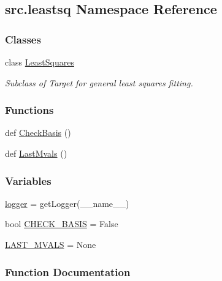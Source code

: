 \hypertarget{namespacesrc_1_1leastsq}{}\subsection{src.\+leastsq Namespace Reference}
\label{namespacesrc_1_1leastsq}
\subsubsection*{Classes}
\begin{DoxyCompactItemize}
\item 
class \hyperlink{classsrc_1_1leastsq_1_1LeastSquares}{Least\+Squares}
\begin{DoxyCompactList}\small\item\em Subclass of Target for general least squares fitting. \end{DoxyCompactList}\end{DoxyCompactItemize}
\subsubsection*{Functions}
\begin{DoxyCompactItemize}
\item 
def \hyperlink{namespacesrc_1_1leastsq_a1e0035c01ad764ea37e1155e546166ee}{Check\+Basis} ()
\item 
def \hyperlink{namespacesrc_1_1leastsq_ac13eca658d4de4215cf76fc17fdd4ba0}{Last\+Mvals} ()
\end{DoxyCompactItemize}
\subsubsection*{Variables}
\begin{DoxyCompactItemize}
\item 
\hyperlink{namespacesrc_1_1leastsq_a478b7f47722f293515ae13ef0e9fd608}{logger} = get\+Logger(\+\_\+\+\_\+name\+\_\+\+\_\+)
\item 
bool \hyperlink{namespacesrc_1_1leastsq_a5d85c458d6f0e81407829ca76d550c87}{C\+H\+E\+C\+K\+\_\+\+B\+A\+S\+IS} = False
\item 
\hyperlink{namespacesrc_1_1leastsq_ade3e357e2b11059f0e45a3d73229cda8}{L\+A\+S\+T\+\_\+\+M\+V\+A\+LS} = None
\end{DoxyCompactItemize}


\subsubsection{Function Documentation}
\mbox{\label{namespacesrc_1_1leastsq_a1e0035c01ad764ea37e1155e546166ee}} 
